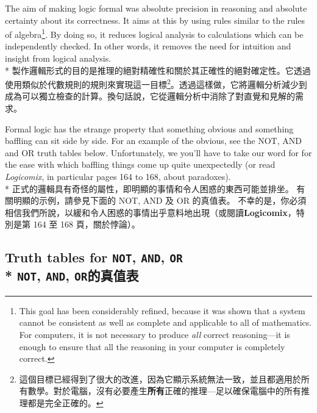 \documentclass[]{article}
\begin{document}
{\color{gray}The aim of making logic formal was absolute precision in reasoning and absolute certainty about its correctness. It aims at this by using rules similar to the rules of algebra\footnote{This goal has been considerably refined, because it was shown that a system cannot be consistent as well as complete and applicable to all of mathematics. For computers, it is not necessary to produce \emph{all} correct reasoning---it is enough to ensure that all the reasoning in your computer is completely correct.}. By doing so, it reduces logical analysis to calculations which can be independently checked. In other words, it removes the need for intuition and insight from logical analysis.}
\\*
{製作邏輯形式的目的是推理的絕對精確性和關於其正確性的絕對確定性。它透過使用類似於代數規則的規則來實現這一目標\footnote{這個目標已經得到了很大的改進，因為它顯示系統無法一致，並且都適用於所有數學。對於電腦，沒有必要產生{\bfseries{所有}}正確的推理---足以確保電腦中的所有推理都是完全正確的。}。透過這樣做，它將邏輯分析減少到成為可以獨立檢查的計算。換句話說，它從邏輯分析中消除了對直覺和見解的需求。}

{\color{gray}Formal logic has the strange property that something obvious and something  baffling can sit side by side. For an example of the obvious, see the NOT, AND and OR truth tables below. Unfortunately, we you'll have to take our word {\color{cyan}for for} the ease with which baffling things come up quite unexpectedly (or read \emph{Logicomix}, in particular pages 164 to 168, about paradoxes).}
\\*
{正式的邏輯具有奇怪的屬性，即明顯的事情和令人困惑的東西可能並排坐。 有關明顯的示例，請參見下面的 NOT, AND 及 OR 的真值表。 不幸的是，你必須相信我們所說，以緩和令人困惑的事情出乎意料地出現（或閱讀{\bfseries{Logicomix}}，特別是第 164 至 168 頁，關於悖論）。}

\subsection*{{\color{gray}Truth tables for  {\tt NOT}, {\tt AND}, {\tt OR}}
\\*
{{\tt NOT}, {\tt AND}, {\tt OR}的真值表}
}
\end{document}
